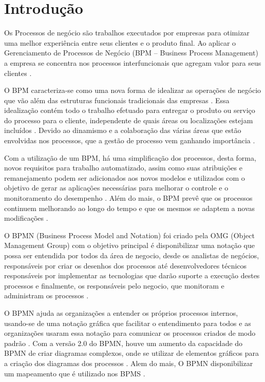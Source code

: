 \chapter{Introdução}
\label{cap:introducao}

Os Processos de negócio são trabalhos executados por empresas para otimizar uma melhor experiência entre seus clientes e o produto final. Ao aplicar o Gerenciamento de Processos de Negócio (BPM – Business Process Management) a empresa se concentra nos processos interfuncionais que agregam valor para seus clientes \cite{CBOK}.

O BPM caracteriza-se como uma nova forma de idealizar as operações de negócio que vão além das estruturas funcionais tradicionais das empresas \cite{CBOK}. Essa idealização contém todo o trabalho efetuado para entregar o produto ou serviço do processo para o cliente, independente de quais áreas ou localizações estejam incluídos \cite{CBOK}. Devido ao dinamismo e a colaboração das várias áreas que estão envolvidas nos processos, que a gestão de processo vem ganhando importância \cite{TechAssistBPM}.

Com a utilização de um BPM, há uma simplificação dos processos, desta forma, novos requisitos para trabalho automatizado, assim como suas atribuições e remanejamento podem ser adicionados aos novos modelos e utilizados com o objetivo de gerar as aplicações necessárias para melhorar o controle e o monitoramento do desempenho \cite{CBOK}. Além do mais, o BPM prevê que os processos continuem melhorando ao longo do tempo e que os mesmos se adaptem a novas modificações \cite{TechAssistBPM}. 

O BPMN (Business Process Model and Notation) foi criado pela OMG (Object Management Group) com o objetivo principal é disponibilizar uma notação que possa ser entendida por todos da área de negocio, desde os analistas de negócios, responsáveis por criar os desenhos dos processos até desenvolvedores técnicos responsáveis por implementar as tecnologias que darão suporte a execução destes processos e finalmente, os responsáveis pelo negocio, que monitoram e administram os processos \cite{OMG}.  

O BPMN ajuda as organizações a entender os próprios processos internos, usando-se de uma notação gráfica que facilitar o entendimento para todos e as organizações usaram essa notação para comunicar os processos criados de modo padrão \cite{OMG}. Com a versão 2.0 do BPMN, houve um aumento da capacidade do BPMN de criar diagramas complexos, onde se utilizar de elementos gráficos para a criação dos diagramas dos processos \cite{TechAssistBPM}. Alem do mais, O BPMN disponibilizar um mapeamento que é utilizado nos BPMS \cite{OMG}.



